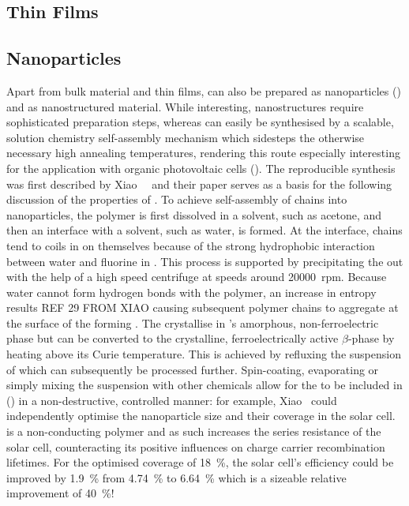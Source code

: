 \subsection{\pvdf{} Thin Films}
\subsection{\pvdf{} Nanoparticles}
Apart from bulk material and thin films, \pvdf{} can also be prepared as nanoparticles (\nps{}) and as nanostructured material. While interesting, \pvdf{} nanostructures require sophisticated preparation steps, whereas \pvdf{} \nps{} can easily be synthesised by a scalable, solution chemistry self-assembly mechanism which sidesteps the otherwise necessary high annealing temperatures, rendering this route especially interesting for the application with organic photovoltaic cells (\opvs{}). The reproducible synthesis was first described by Xiao~\etal{}~\cite{NPsynthesis} and their paper serves as a basis for the following discussion of the properties of \pvdf{} \nps{}. To achieve self-assembly of \pvdf{} chains into nanoparticles, the polymer is first dissolved in a  solvent, such as acetone, and then an interface with a  solvent, such as water, is formed. At the interface, \pvdf{} chains tend to coils in on themselves because of the strong hydrophobic interaction between water and fluorine in \pvdf{}. This process is supported by precipitating the \nps{} out with the help of a high speed centrifuge at speeds around \SI{20000}{rpm}. Because water cannot form hydrogen bonds with the polymer, an increase in entropy results REF 29 FROM XIAO causing subsequent polymer chains to aggregate at the surface of the forming \np{}. The \nps{} crystallise in \pvdf{}'s amorphous, non-ferroelectric phase but can be converted to the crystalline, ferroelectrically  active $\beta$-phase by heating above its Curie temperature. This is achieved by refluxing the suspension of \nps{} which can subsequently be processed further. Spin-coating, evaporating or simply mixing the suspension with other chemicals allow for the \nps{} to be included in (\opvs{}) in a non-destructive, controlled manner: for example, Xiao~\etal{} could independently optimise the nanoparticle size and their coverage in the solar cell. \pvdf{} is a non-conducting polymer and as such increases the series resistance of the solar cell, counteracting its positive influences on charge carrier recombination lifetimes. For the optimised coverage of  \SI{18}{\percent}, the solar cell's efficiency could be improved by \SI{1.9}{\percent} from \SI{4.74}{\percent} to \SI{6.64}{\percent} which is a sizeable relative improvement of  \SI{40}{\percent}!

